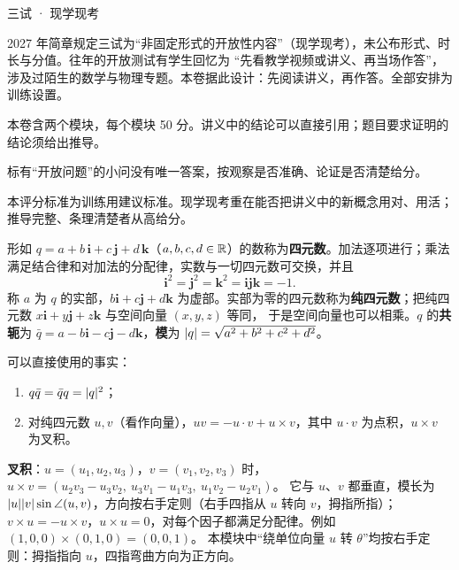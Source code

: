 \documentclass[cjk=noto, seal=first]{mojing-exam}
\newenvironment{lecture}[1]
  {\begin{tcolorbox}[colback=white, colframe=black!45, boxrule=.5pt, arc=0pt,
     left=2mm, right=2mm, top=1mm, bottom=1mm, fonttitle=\sffamily\bfseries,
     coltitle=black, colbacktitle=black!8, title={#1}]}
  {\end{tcolorbox}}
\begin{document}
\begin{paper}[time={建议 2.5 小时，含阅读（训练设置）}, full=100]{三试 · 现学现考}

\begin{instructions}
  \item 2027 年简章规定三试为“非固定形式的开放性内容”（现学现考），未公布形式、时长与分值。往年的开放测试有学生回忆为
        “先看教学视频或讲义、再当场作答”，涉及过陌生的数学与物理专题。本卷据此设计：先阅读讲义，再作答。全部安排为训练设置。
  \item 本卷含两个模块，每个模块 50 分。讲义中的结论可以直接引用；题目要求证明的结论须给出推导。
  \item 标有“开放问题”的小问没有唯一答案，按观察是否准确、论证是否清楚给分。
\end{instructions}

\begin{gradingnotes}
  \item 本评分标准为训练用建议标准。现学现考重在能否把讲义中的新概念用对、用活；推导完整、条理清楚者从高给分。
\end{gradingnotes}



\begin{lecture}{讲义 A　四元数}
形如 $q=a+b\,\mathbf i+c\,\mathbf j+d\,\mathbf k$（$a,b,c,d\in\mathbb{R}$）的数称为\textbf{四元数}。加法逐项进行；乘法满足结合律和对加法的分配律，实数与一切四元数可交换，并且
\[
  \mathbf i^2=\mathbf j^2=\mathbf k^2=\mathbf i\mathbf j\mathbf k=-1 .
\]
称 $a$ 为 $q$ 的实部，$b\mathbf i+c\mathbf j+d\mathbf k$ 为虚部。实部为零的四元数称为\textbf{纯四元数}；把纯四元数 $x\mathbf i+y\mathbf j+z\mathbf k$ 与空间向量 $(x,y,z)$ 等同，
于是空间向量也可以相乘。$q$ 的\textbf{共轭}为 $\bar q=a-b\mathbf i-c\mathbf j-d\mathbf k$，\textbf{模}为 $\lvert q\rvert=\sqrt{a^2+b^2+c^2+d^2}$。

可以直接使用的事实：
\begin{enumerate}
  \item $q\bar q=\bar qq=\lvert q\rvert^2$；
  \item 对纯四元数 $u,v$（看作向量），$uv=-u\cdot v+u\times v$，其中 $u\cdot v$ 为点积，$u\times v$ 为叉积。
\end{enumerate}
\textbf{叉积}：$u=(u_1,u_2,u_3)$，$v=(v_1,v_2,v_3)$ 时，$u\times v=(u_2v_3-u_3v_2,\ u_3v_1-u_1v_3,\ u_1v_2-u_2v_1)$。
它与 $u$、$v$ 都垂直，模长为 $\lvert u\rvert\lvert v\rvert\sin\angle(u,v)$，方向按右手定则（右手四指从 $u$ 转向 $v$，拇指所指）；
$v\times u=-u\times v$，$u\times u=0$，对每个因子都满足分配律。例如 $(1,0,0)\times(0,1,0)=(0,0,1)$。
本模块中“绕单位向量 $u$ 转 $\theta$”均按右手定则：拇指指向 $u$，四指弯曲方向为正方向。
\end{lecture}


\end{paper}
\end{document}
